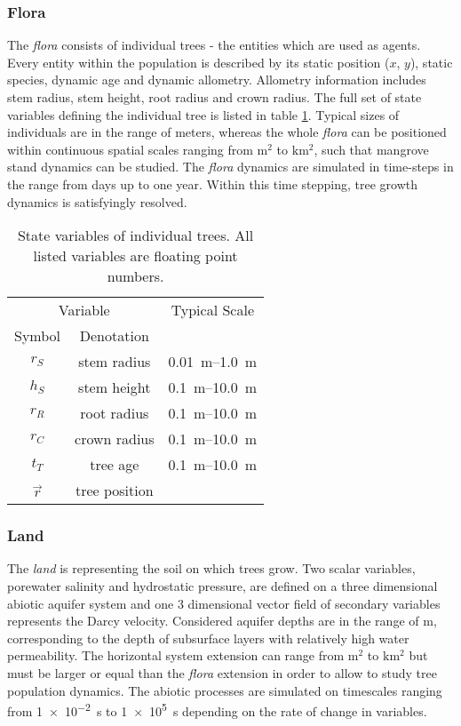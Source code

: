 \subsubsection{Flora}
The \textit{flora} consists of individual trees - the entities which are used as agents.
Every entity within the population is described by its static position ($x$, $y$), static species, dynamic age and dynamic allometry.
Allometry information includes stem radius, stem height, root radius and crown radius.
The full set of state variables defining the individual tree is listed in table \ref{tab_bettina_variables}.
Typical sizes of individuals are in the range of meters, whereas the whole \textit{flora} can be positioned within continuous spatial scales ranging from $\mathrm{m^2}$ to $\mathrm{km^2}$, such that mangrove stand dynamics can be studied.
The \textit{flora} dynamics are simulated in time-steps in the range from days up to one year.
Within this time stepping, tree growth dynamics is satisfyingly resolved.
\begin{table}[h]
\centering
\begin{tabular}{|c|c|c|}
\hline 
\multicolumn{2}{|c|}{Variable} & Typical Scale \\
Symbol & Denotation & \\ 
\hline 
$r_S$ & stem radius  & \SIrange{0.01}{1.0}{m}  \\ 
\hline 
$h_S$ & stem height  & \SIrange{0.1}{10.0}{m}  \\ 
\hline 
$r_R$ & root radius  & \SIrange{0.1}{10.0}{m}  \\ 
\hline 
$r_C$ & crown radius  & \SIrange{0.1}{10.0}{m}  \\ 
\hline 
$t_T$ & tree age  & \SIrange{0.1}{10.0}{m} \\ 
\hline 
$\vec{r}$ & tree position  &   \\ 
\hline 
\end{tabular} 
\caption{State variables of individual trees.
All listed variables are floating point numbers.}\label{tab_bettina_variables}
\end{table}
\subsubsection{Land}
The \textit{land} is representing the soil on which trees grow.
Two scalar variables, porewater salinity and hydrostatic pressure, are defined on a three dimensional abiotic aquifer system and one 3 dimensional vector field of secondary variables represents the Darcy velocity.
Considered aquifer depths are in the range of $\mathrm{m}$, corresponding to the depth of subsurface layers with relatively high water permeability.
The horizontal system extension can range from $\mathrm{m^2}$ to $\mathrm{km^2}$ but must be larger or equal than the \textit{flora} extension in order to allow to study tree population dynamics.
The abiotic processes are simulated on timescales ranging from \SI{1e-2}{s} to \SI{1e5}{s} depending on the rate of change in variables.

